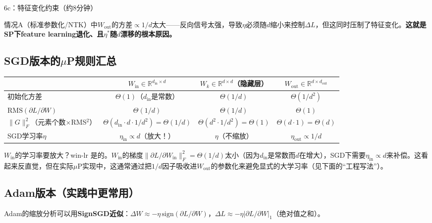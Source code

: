 \documentclass[11pt,a4paper]{article}
\newcommand{\R}{\mathbb{R}}
\begin{document}
\begin{handcalc}{6c：特征变化约束（约8分钟）}
\begin{tcolorbox}[colback=red!5,colframe=red!60!black,title=\textbf{$\mu$P的推导结论}]
情况A（标准参数化/NTK）中$W_{\text{out}}$的方差$\propto 1/d$太大——反向信号太强，导致$\eta$必须随$d$缩小来控制$\Delta L$，但这同时压制了特征变化。\textbf{这就是SP下feature learning退化、且$\eta^*$随$d$漂移的根本原因。}
\end{tcolorbox}
\end{handcalc}

\subsection{SGD版本的$\mu$P规则汇总}

\begin{center}
\renewcommand{\arraystretch}{1.4}
\begin{tabular}{l|ccc}
\toprule
& $W_{\text{in}}\in\R^{d_{\text{in}}\times d}$ & $W_k\in\R^{d\times d}$（隐藏层） & $W_{\text{out}}\in\R^{d\times d_{\text{out}}}$ \\
\midrule
初始化方差 & $\Theta(1)$（$d_{\text{in}}$是常数） & $\Theta(1/d)$ & $\Theta(1/d^2)$ \\
$\text{RMS}(\partial L/\partial W)$ & $\Theta(1/d)$ & $\Theta(1/d)$ & $\Theta(1)$ \\
$\|G\|_F^2$（元素个数$\times$RMS$^2$） & $\Theta(d_{\text{in}}\cdot d\cdot 1/d^2)=\Theta(1/d)$ & $\Theta(d^2\cdot 1/d^2)=\Theta(1)$ & $\Theta(d\cdot 1)=\Theta(d)$ \\
SGD学习率$\eta$ & $\eta_{\text{in}}\propto d$（放大！） & $\eta$（不缩放） & $\eta_{\text{out}}\propto 1/d$ \\
\bottomrule
\end{tabular}
\end{center}

\begin{remark}{$W_{\text{in}}$的学习率要放大？}{win-lr}
是的。$W_{\text{in}}$的梯度$\|\partial L/\partial W_{\text{in}}\|_F^2=\Theta(1/d)$太小（因为$d_{\text{in}}$是常数而$d$在增大），SGD下需要$\eta_{\text{in}}\propto d$来补偿。这看起来反直觉，但在实际$\mu$P实现中，这通常通过把$1/d$因子吸收进$W_{\text{out}}$的参数化来避免显式的大学习率（见下面的``工程写法''）。
\end{remark}

\subsection{Adam版本（实践中更常用）}

Adam的缩放分析可以用\textbf{SignSGD近似}：$\Delta W\approx -\eta\,\text{sign}(\partial L/\partial W)$，$\Delta L\approx -\eta|\partial L/\partial W|_1$（绝对值之和）。
\end{document}
